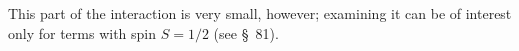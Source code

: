 This part of the interaction is very small, however; examining it can be of interest only for terms with spin $S=1/2$ (see \S~81).
